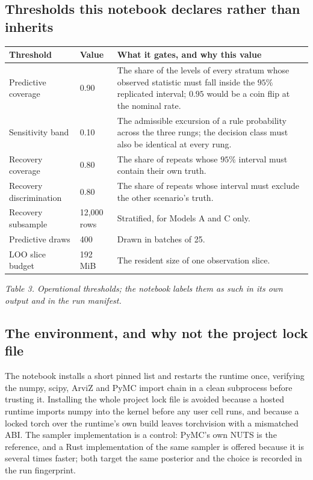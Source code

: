 \documentclass[10pt,a4paper]{article}
\begin{document}
\subsection{Thresholds this notebook declares rather than inherits}
\begin{center}\small
\begin{tabularx}{\textwidth}{@{}L{3.3cm}L{1.8cm}Y@{}}
\toprule
\textbf{Threshold} & \textbf{Value} & \textbf{What it gates, and why this value}\\
\midrule
Predictive coverage & 0.90 & The share of the levels of every stratum whose observed statistic must fall inside the $95\%$ replicated interval; $0.95$ would be a coin flip at the nominal rate.\\
Sensitivity band & 0.10 & The admissible excursion of a rule probability across the three rungs; the decision class must also be identical at every rung.\\
Recovery coverage & 0.80 & The share of repeats whose $95\%$ interval must contain their own truth.\\
Recovery discrimination & 0.80 & The share of repeats whose interval must exclude the other scenario's truth.\\
Recovery subsample & 12{,}000 rows & Stratified, for Models A and C only.\\
Predictive draws & 400 & Drawn in batches of 25.\\
LOO slice budget & 192\,MiB & The resident size of one observation slice.\\
\bottomrule
\end{tabularx}
\end{center}
{\small\itshape Table 3. Operational thresholds; the notebook labels them as such in its own output and in the run manifest.}

\subsection{The environment, and why not the project lock file}
The notebook installs a short pinned list and restarts the runtime once, verifying the numpy, scipy, ArviZ and PyMC import chain in a clean subprocess before trusting it. Installing the whole project lock file is avoided because a hosted runtime imports numpy into the kernel before any user cell runs, and because a locked torch over the runtime's own build leaves torchvision with a mismatched ABI. The sampler implementation is a control: PyMC's own NUTS is the reference, and a Rust implementation of the same sampler is offered because it is several times faster; both target the same posterior and the choice is recorded in the run fingerprint.
\end{document}
